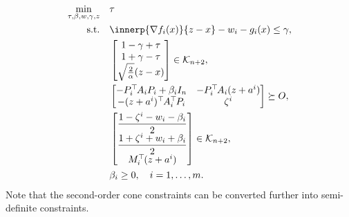 \documentclass[../../main]{subfiles}
\begin{document}
\begin{equation} \label{eq:sdp}
    \begin{aligned}
        \min_{\tau, \beta, w, \gamma, z} \quad   &\tau \\ 
        \st    \quad   &\innerp{\nabla f_i(x)}{z - x} - w_i - g_i(x) \leq \gamma, \\
                       & \begin{bmatrix} 1 - \gamma + \tau \\
                           1 + \gamma - \tau \\
                           \sqrt{\frac{2}{\alpha}} (z - x)
                       \end{bmatrix} \in \mathcal{K}_{n + 2}, \\
                       & 
                       \begin{bmatrix}
                           -P_i^\T A_i P_i + \beta_i I_n & -P_i^\T A_i (z + a^i) \\
                           -(z + a^i)^\T A_i^\T P_i & \zeta^i
                       \end{bmatrix} \succeq
                       O, \\
                       & \begin{bmatrix} \dfrac{1 - \zeta^i - w_i - \beta_i}{2} \\
                           \dfrac{1 + \zeta^i + w_i + \beta_i}{2} \\
                           M_i^\T (z + a^i)
                       \end{bmatrix} \in \mathcal{K}_{n + 2}, \\
                       & \beta_i \geq 0,  \quad i = 1,\ldots,m.
    \end{aligned}
\end{equation}
Note that the second-order cone constraints can be converted further into semi-definite constraints.
\end{document}
